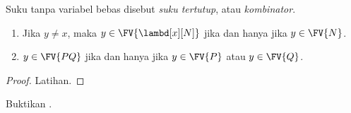 \documentclass[../../../include/open-logic-section]{subfiles}
\begin{document}
\begin{defn}
  Suku tanpa variabel bebas disebut \emph{suku tertutup}, atau
  \emph{kombinator}.
\end{defn}

\begin{lem}
  \begin{enumerate}
    \item {} Jika $y \neq x$, maka $y \in
      \FV{\lambd[x][N]}$ jika dan hanya jika $y \in \FV{N}$.
    \item {} $y \in \FV{PQ}$ jika dan hanya jika $y \in
      \FV{P}$ atau $y \in \FV{Q}$.
    \end{enumerate}
\end{lem}

\begin{proof}
  Latihan.
\end{proof}

\begin{prob}
  Buktikan .
\end{prob}
\end{document}

